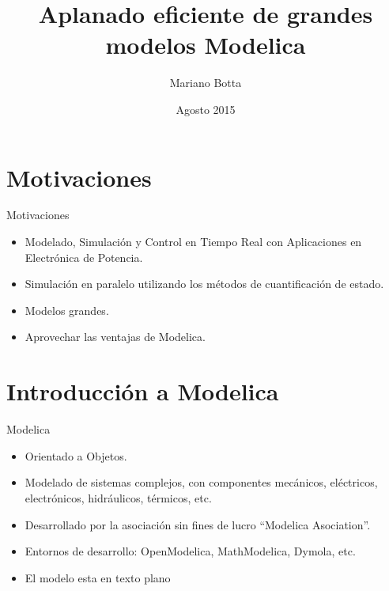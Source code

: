 \documentclass[aspectratio=169,10pt]{beamer}
\title{Aplanado eficiente de grandes modelos Modelica}
\author[M.Botta] {Mariano Botta }
\institute[UNR] %
{ FCEIA, UNR }
\date {Agosto 2015}
\begin{document}
\begin{frame}
  \titlepage
\end{frame}

 
\section{Motivaciones}  

\begin{frame}{Motivaciones}
    \begin{itemize}
     \item Modelado, Simulaci\'on y Control en Tiempo Real con Aplicaciones en Electr\'onica de Potencia.
     \item Simulaci\'on en paralelo utilizando los m\'etodos de cuantificaci\'on de estado.  
     \item Modelos grandes.
     \item Aprovechar las ventajas de Modelica.
    \end{itemize}
\end{frame}

\section{Introducci\'on a Modelica}

\begin{frame}{Modelica} 
    \begin{itemize}
        \item Orientado a Objetos.
        \item Modelado de sistemas complejos, con componentes mec\'anicos, el\'ectricos, electr\'onicos, hidr\'aulicos, t\'ermicos, etc.     
        \item Desarrollado por la asociaci\'on sin fines de lucro ``Modelica Asociation''.
        \item Entornos de desarrollo: OpenModelica, MathModelica, Dymola, etc.
        
        \item El modelo esta en texto plano
    \end{itemize}
\end{frame}
 
\end{document}
